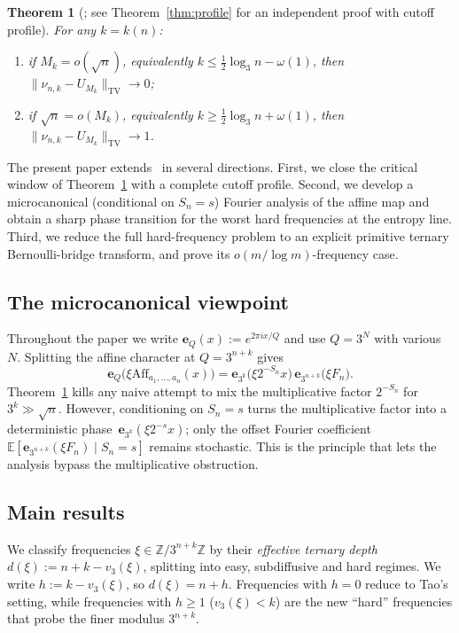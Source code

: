 \documentclass[11pt,a4paper]{amsart}
\theoremstyle{plain}
\newtheorem{theorem}{Theorem}[section]
\theoremstyle{definition}
\newcommand{\Z}{\mathbb{Z}}
\newcommand{\E}{\mathbb{E}}
\newcommand{\TV}{\mathrm{TV}}
\newcommand{\Aff}{\mathrm{Aff}}
\newcommand{\eQ}{\mathbf{e}_Q}
\begin{document}
\begin{theorem}[\cite{SiNote}; see Theorem~\ref{thm:profile} for an independent proof with cutoff profile]\label{thm:thresh}
For any $k=k(n)$:
\begin{enumerate}[label=\textup{(\alph*)}]
\item if $M_k=o(\sqrt n)$, equivalently $k\le\tfrac12\log_3n-\omega(1)$,
then $\|\nu_{n,k}-U_{M_k}\|_{\TV}\to0$;
\item if $\sqrt n=o(M_k)$, equivalently $k\ge\tfrac12\log_3n+\omega(1)$,
then $\|\nu_{n,k}-U_{M_k}\|_{\TV}\to1$.
\end{enumerate}
\end{theorem}

The present paper extends~\cite{SiNote} in several directions.
First, we close the critical window of Theorem~\ref{thm:thresh} with a
complete cutoff profile.
Second, we develop a microcanonical (conditional on $S_n=s$) Fourier
analysis of the affine map and obtain a sharp phase transition for the
worst hard frequencies at the entropy line.
Third, we reduce the full hard-frequency problem to an explicit primitive
ternary Bernoulli-bridge transform, and prove its $o(m/\log m)$-frequency case.

\subsection{The microcanonical viewpoint}
Throughout the paper we write
$\eQ(x):=e^{2\pi ix/Q}$ and use $Q=3^N$ with various $N$.
Splitting the affine character at $Q=3^{n+k}$ gives
\begin{equation}\label{eq:split}
\eQ\!\bigl(\xi\Aff_{a_1,\dots,a_n}(x)\bigr)
=\mathbf e_{3^k}\!\bigl(\xi 2^{-S_n}x\bigr)\,
\mathbf e_{3^{n+k}}\!\bigl(\xi F_n\bigr).
\end{equation}
Theorem~\ref{thm:thresh} kills any naive attempt to mix the multiplicative
factor $2^{-S_n}$ for $3^k\gg\sqrt n$.
However, conditioning on $S_n=s$ turns the multiplicative factor into a
deterministic phase~$\mathbf e_{3^k}(\xi 2^{-s}x)$; only the offset Fourier
coefficient $\E[\mathbf e_{3^{n+k}}(\xi F_n)\mid S_n=s]$ remains stochastic.
This is the principle that lets the analysis bypass the multiplicative
obstruction.

\subsection{Main results}
We classify frequencies $\xi\in\Z/3^{n+k}\Z$ by their \emph{effective
ternary depth}
$d(\xi):=n+k-v_3(\xi)$,
splitting into easy, subdiffusive and hard regimes.
We write $h:=k-v_3(\xi)$, so $d(\xi)=n+h$.
Frequencies with $h=0$ reduce to Tao's setting, while frequencies with
$h\ge1$ ($v_3(\xi)<k$) are the new ``hard'' frequencies that probe the
finer modulus $3^{n+k}$.
\end{document}
